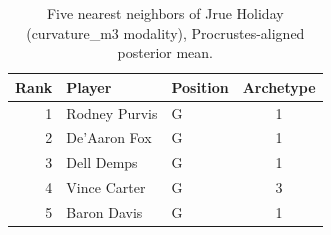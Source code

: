 \begin{table}[htbp]
  \centering\small
  \begin{tabular}{rllc}
    \toprule
    Rank & Player & Position & Archetype \\
    \midrule
    1 & Rodney Purvis & G & 1 \\
    2 & De'Aaron Fox & G & 1 \\
    3 & Dell Demps & G & 1 \\
    4 & Vince Carter & G & 3 \\
    5 & Baron Davis & G & 1 \\
    \bottomrule
  \end{tabular}
  \caption{Five nearest neighbors of Jrue Holiday (curvature_m3 modality), Procrustes-aligned posterior mean.}
  \label{tab:Jrue_Holiday_neighbors_curvature_m3}
\end{table}

